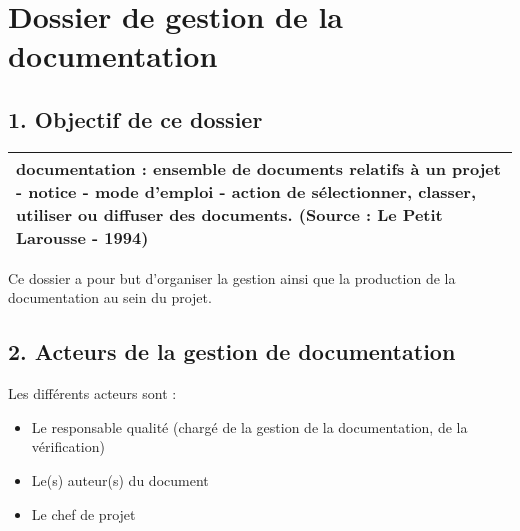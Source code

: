 \documentclass{article}
\title{}
\author{}
\date{}
\begin{document}
\section[Dossier de gestion de la documentation]{Dossier de gestion de
la documentation}

\bigskip

\subsection[1. Objectif de ce dossier]{1. Objectif de ce dossier}

\bigskip

\begin{flushleft}
\tablehead{}
\begin{supertabular}{|m{16.345cm}|}
\hline
documentation : ensemble de documents relatifs à un projet - notice -
mode d’emploi - action de sélectionner, classer, utiliser ou diffuser
des documents. (Source : Le Petit Larousse - 1994)\\\hline
\end{supertabular}
\end{flushleft}

\bigskip

Ce dossier a pour but d’organiser la gestion ainsi que la production de
la documentation au sein du projet.


\bigskip

\subsection[2. Acteurs de la gestion de documentation]{2. Acteurs de la
gestion de documentation}

\bigskip

Les différents acteurs sont :

\begin{itemize}
\item Le responsable qualité (chargé de la gestion de la documentation,
de la vérification)
\item Le(s) auteur(s) du document
\item Le chef de projet
\end{itemize}

\bigskip
\end{document}
